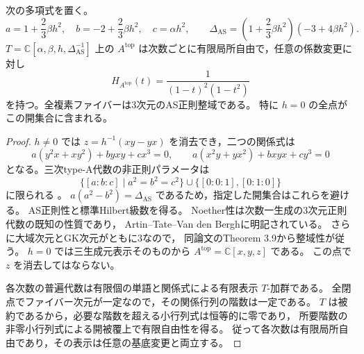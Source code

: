 \begin{lemma}\label{lem:elliptic-top-as-open}
次の多項式を置く。
\[
 a=1+\frac23\beta h^2,\quad b=-2+\frac23\beta h^2,\quad
 c=\alpha h^2,\qquad
 \Delta_{\mathrm{AS}}=
   \left(1+\frac23\beta h^2\right)(-3+4\beta h^2).
\]
$T=\mathbb C[\alpha,\beta,h,\Delta_{\mathrm{AS}}^{-1}]$ 上の
$A^{\mathrm{top}}$ は次数ごとに有限局所自由で，任意の係数変更に対し
\[
 H_{A^{\mathrm{top}}}(t)=\frac1{(1-t)^2(1-t^2)}
\]
を持つ。全複素ファイバーは3次元のAS正則整域である。
特に $h=0$ の全点がこの開集合に含まれる。
\end{lemma}
\begin{proof}
$h\ne0$ では $z=h^{-1}(xy-yx)$ を消去でき，二つの関係式は
\[
 a(y^2x+xy^2)+byxy+cx^3=0,\qquad
 a(x^2y+yx^2)+bxyx+cy^3=0
\]
となる。三次type-A代数の非正則パラメータは
\[
 \{[a:b:c]\mid a^2=b^2=c^2\}
   \cup\{[0:0:1],[0:1:0]\}
\]
に限られる
\cite[Example 3.11, (75)--(76)]{BelmansRaedschelders2020}。
$a(a^2-b^2)=\Delta_{\mathrm{AS}}$ であるため，指定した開集合はこれらを避ける。
AS正則性と標準Hilbert級数を得る。
Noether性は次数一生成の3次元正則代数の既知の性質であり，
Artin--Tate--Van den Bergh\cite[Section 2, p.~338]{ATV1991}に明記されている。
さらに大域次元とGK次元がともに3なので，
同論文のTheorem 3.9から整域性が従う。
$h=0$ では三生成元表示そのものから $A^{\mathrm{top}}=\mathbb C[x,y,z]$ である。
この点で $z$ を消去してはならない。

各次数の普遍代数は有限個の単語と関係式による有限表示 $T$-加群である。
全閉点でファイバー次元が一定なので，その関係行列の階数は一定である。
$T$ は被約であるから，必要な階数を超える小行列式は恒等的に零であり，
所要階数の非零小行列式による開被覆上で有限自由性を得る。
従って各次数は有限局所自由であり，その表示は任意の基底変更と両立する。
\end{proof}

